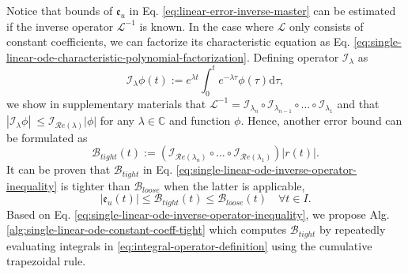 \documentclass[accepted]{uai2023}
\newcommand{\Err}{\mathfrak{e}}
\newcommand{\Bound}{\mathcal{B}}
\renewcommand{\L}{\mathcal{L}}
\newcommand{\I}{\mathcal{I}}
\renewcommand{\Re}[1]{\mathcal{R}e\left(#1\right)}
\begin{document}
    Notice that bounds of $\Err_u$ in Eq. \ref{eq:linear-error-inverse-master} can be estimated if the inverse operator $\L^{-1}$ is known. 
    In the case where $\L$ only consists of constant coefficients, we can factorize its characteristic equation as Eq. \ref{eq:single-linear-ode-characteristic-polynomial-factorization}.
    Defining operator $\I_{\lambda}$ as 
    \begin{equation} \label{eq:integral-operator-definition}
        \I_\lambda \phi(t) := e^{{\lambda} t} \int_{0}^{t} e^{-{\lambda} \tau} \phi(\tau) \mathrm{d}\tau,
    \end{equation}
    we show in supplementary materials that $\L^{-1} = \I_{\lambda_{n}} \circ \I_{\lambda_{n-1}} \circ \dots \circ \I_{\lambda_1}$ and that $\left|\I_{\lambda} \phi\right| \ \leq \I_{\Re{\lambda}} |\phi|$ for any $\lambda \in \mathbb{C}$ and function $\phi$.
    Hence, another error bound can be formulated as
    \begin{equation} \label{eq:single-linear-ode-inverse-operator-inequality}
        \Bound_{tight}(t) := \left(\I_{\Re{\lambda_{n}}} \circ \dots \circ \I_{\Re{\lambda_1}}\right) |r(t)|.
    \end{equation}
    It can be proven that $\Bound_{tight}$ in Eq. \ref{eq:single-linear-ode-inverse-operator-inequality} is tighter than $\Bound_{loose}$ when the latter is applicable,
    \begin{equation}
        \left|\Err_u(t)\right| \leq \Bound_{tight}(t) \leq \Bound_{loose}(t) \quad \forall t \in I.
    \end{equation}
    Based on Eq. \ref{eq:single-linear-ode-inverse-operator-inequality}, we propose Alg. \ref{alg:single-linear-ode-constant-coeff-tight} which computes $\Bound_{tight}$ by repeatedly evaluating integrals in \ref{eq:integral-operator-definition} using the cumulative trapezoidal rule.
\end{document}
